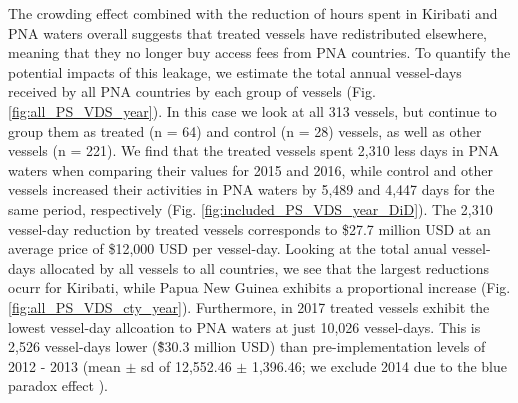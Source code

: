\documentclass[9p,twocolumn,twoside,lineno]{pnas-new}
\begin{document}
The crowding effect combined with the reduction of hours spent in Kiribati and PNA waters overall suggests that treated vessels have redistributed elsewhere, meaning that they no longer buy access fees from PNA countries. To quantify the potential impacts of this leakage, we estimate the total annual vessel-days received by all PNA countries by each group of vessels (Fig. \ref{fig:all_PS_VDS_year}). In this case we look at all 313 vessels, but continue to group them as treated (n = 64) and control (n = 28) vessels, as well as other vessels (n = 221). We find that the treated vessels spent 2,310 less days in PNA waters when comparing their values for 2015 and 2016, while control and other vessels increased their activities in PNA waters by 5,489 and 4,447 days for the same period, respectively (Fig. \ref{fig:included_PS_VDS_year_DiD}). The 2,310 vessel-day reduction by treated vessels corresponds to \$27.7 million USD at an average price of \$12,000 USD per vessel-day. Looking at the total anual vessel-days allocated by all vessels to all countries, we see that the largest reductions ocurr for Kiribati, while Papua New Guinea exhibits a proportional increase (Fig. \ref{fig:all_PS_VDS_cty_year}). Furthermore, in 2017 treated vessels exhibit the lowest vessel-day allcoation to PNA waters at just 10,026 vessel-days. This is 2,526 vessel-days lower (\~\$30.3 million USD) than pre-implementation levels of 2012 - 2013 (mean $\pm$ sd of 12,552.46 $\pm$ 1,396.46; we exclude 2014 due to the blue paradox effect \cite{mcdermott_2018}). %
\end{document}
